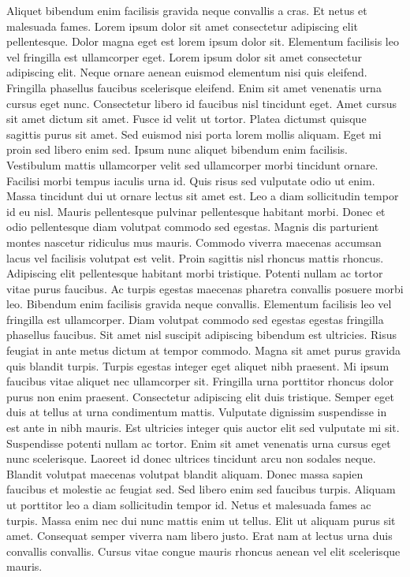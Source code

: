 Aliquet bibendum enim facilisis gravida neque convallis a cras. Et netus et malesuada fames. Lorem ipsum dolor sit amet consectetur adipiscing elit pellentesque. Dolor magna eget est lorem ipsum dolor sit. Elementum facilisis leo vel fringilla est ullamcorper eget. Lorem ipsum dolor sit amet consectetur adipiscing elit. Neque ornare aenean euismod elementum nisi quis eleifend. Fringilla phasellus faucibus scelerisque eleifend. Enim sit amet venenatis urna cursus eget nunc. Consectetur libero id faucibus nisl tincidunt eget. Amet cursus sit amet dictum sit amet. Fusce id velit ut tortor.
Platea dictumst quisque sagittis purus sit amet. Sed euismod nisi porta lorem mollis aliquam. Eget mi proin sed libero enim sed. Ipsum nunc aliquet bibendum enim facilisis. Vestibulum mattis ullamcorper velit sed ullamcorper morbi tincidunt ornare. Facilisi morbi tempus iaculis urna id. Quis risus sed vulputate odio ut enim. Massa tincidunt dui ut ornare lectus sit amet est. Leo a diam sollicitudin tempor id eu nisl. Mauris pellentesque pulvinar pellentesque habitant morbi. Donec et odio pellentesque diam volutpat commodo sed egestas. Magnis dis parturient montes nascetur ridiculus mus mauris. Commodo viverra maecenas accumsan lacus vel facilisis volutpat est velit. Proin sagittis nisl rhoncus mattis rhoncus. Adipiscing elit pellentesque habitant morbi tristique. Potenti nullam ac tortor vitae purus faucibus. Ac turpis egestas maecenas pharetra convallis posuere morbi leo.
Bibendum enim facilisis gravida neque convallis. Elementum facilisis leo vel fringilla est ullamcorper. Diam volutpat commodo sed egestas egestas fringilla phasellus faucibus. Sit amet nisl suscipit adipiscing bibendum est ultricies. Risus feugiat in ante metus dictum at tempor commodo. Magna sit amet purus gravida quis blandit turpis. Turpis egestas integer eget aliquet nibh praesent. Mi ipsum faucibus vitae aliquet nec ullamcorper sit. Fringilla urna porttitor rhoncus dolor purus non enim praesent. Consectetur adipiscing elit duis tristique.
Semper eget duis at tellus at urna condimentum mattis. Vulputate dignissim suspendisse in est ante in nibh mauris. Est ultricies integer quis auctor elit sed vulputate mi sit. Suspendisse potenti nullam ac tortor. Enim sit amet venenatis urna cursus eget nunc scelerisque. Laoreet id donec ultrices tincidunt arcu non sodales neque. Blandit volutpat maecenas volutpat blandit aliquam. Donec massa sapien faucibus et molestie ac feugiat sed. Sed libero enim sed faucibus turpis. Aliquam ut porttitor leo a diam sollicitudin tempor id. Netus et malesuada fames ac turpis. Massa enim nec dui nunc mattis enim ut tellus. Elit ut aliquam purus sit amet. Consequat semper viverra nam libero justo. Erat nam at lectus urna duis convallis convallis. Cursus vitae congue mauris rhoncus aenean vel elit scelerisque mauris.
